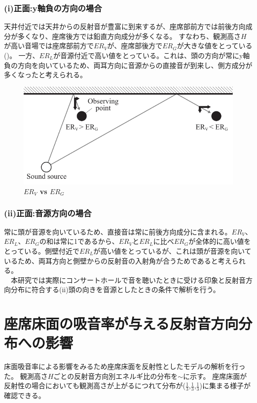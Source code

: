 


\subsubsection{(i)正面:y軸負の方向の場合}
天井付近では天井からの反射音が豊富に到来するが、座席部前方では前後方向成分が多くなり、座席後方では鉛直方向成分が多くなる。
すなわち、観測高さ$H$が高い音場では座席部前方で$ER_V$が、座席部後方で$ER_G$が大きな値をとっている()。
一方、$ER_L$が音源付近で高い値をとっている。これは、頭の方向が常にy軸負の方向を向いているため、両耳方向に音源からの直接音が到来し、側方成分が多くなったと考えられる。
\\
\begin{figure}[htbp]
    \centering
    \includegraphics[keepaspectratio,scale=1]{05_att/er_reason.pdf}
    \caption{\hspace{1mm}\textbf{$ER_V$ vs $ER_G$}}
    \label{fig:er_reason}
\end{figure}

\subsubsection{(ii)正面:音源方向の場合}
常に頭が音源を向いているため、直接音は常に前後方向成分に含まれる。$ER_V$、$ER_L$、$ER_G$の和は常に1であるから、$ER_V$と$ER_L$に比べ$ER_G$が全体的に高い値をとっている。側壁付近で$ER_L$が高い値をとっているが、これは頭が音源を向いているため、両耳方向と側壁からの反射音の入射角が合うためであると考えられる。
\\　本研究では実際にコンサートホールで音を聴いたときに受ける印象と反射音方向分布に符合する(ii)頭の向きを音源としたときの条件で解析を行う。

\pagebreak

\clearpage

\section{座席床面の吸音率が与える反射音方向分布への影響}
床面吸音率による影響をみるため座席床面を反射性としたモデルの解析を行った。
観測高さ$H$ごとの反射音方向別エネルギ比の分布を$\sim$に示す。
座席床面が反射性の場合においても観測高さが上がるにつれて分布が($\frac{1}{3}$,$\frac{1}{3}$,$\frac{1}{3}$)に集まる様子が確認できる。

